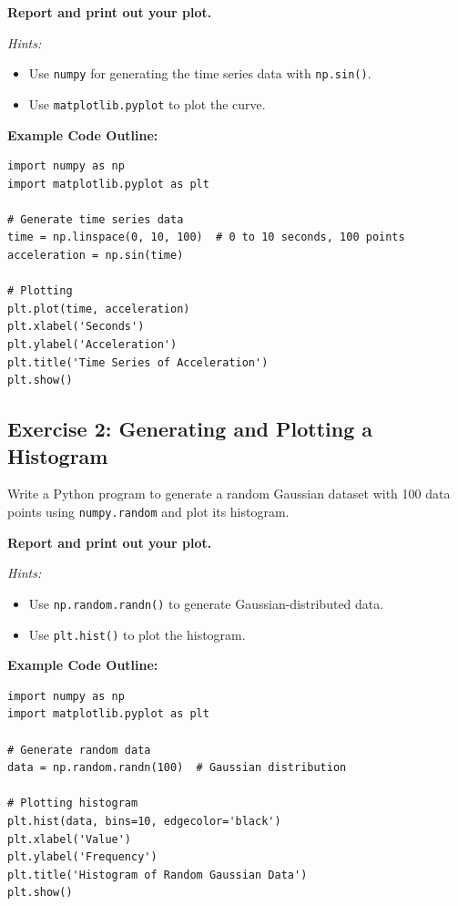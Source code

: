 \documentclass[12pt]{article}
\begin{document}
\textbf{Report and print out your plot. }

\textit{Hints:}
\begin{itemize}
    \item Use \texttt{numpy} for generating the time series data with \texttt{np.sin()}.
    \item Use \texttt{matplotlib.pyplot} to plot the curve.
\end{itemize}

\textbf{Example Code Outline:}
\begin{verbatim}
import numpy as np
import matplotlib.pyplot as plt

# Generate time series data
time = np.linspace(0, 10, 100)  # 0 to 10 seconds, 100 points
acceleration = np.sin(time)

# Plotting
plt.plot(time, acceleration)
plt.xlabel('Seconds')
plt.ylabel('Acceleration')
plt.title('Time Series of Acceleration')
plt.show()
\end{verbatim}

\subsection*{Exercise 2: Generating and Plotting a Histogram}
Write a Python program to generate a random Gaussian dataset with 100 data points using \texttt{numpy.random} and plot its histogram.

\textbf{Report and print out your plot. }

\textit{Hints:}
\begin{itemize}
    \item Use \texttt{np.random.randn()} to generate Gaussian-distributed data.
    \item Use \texttt{plt.hist()} to plot the histogram.
\end{itemize}

\textbf{Example Code Outline:}
\begin{verbatim}
import numpy as np
import matplotlib.pyplot as plt

# Generate random data
data = np.random.randn(100)  # Gaussian distribution

# Plotting histogram
plt.hist(data, bins=10, edgecolor='black')
plt.xlabel('Value')
plt.ylabel('Frequency')
plt.title('Histogram of Random Gaussian Data')
plt.show()
\end{verbatim}
\end{document}
